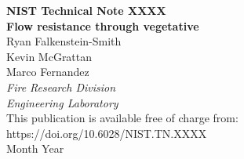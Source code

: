 \documentclass[12pt]{article}
\newcommand{\pubnumber}{XXXX}
\newcommand{\DOI}{https://doi.org/10.6028/NIST.TN.XXXX}
\newcommand{\monthyear}{Month Year}
\begin{document}
\begin{titlepage}
\begin{flushright}
\LARGE{\textbf{NIST Technical Note \pubnumber}}\\
\vfill 
\Huge{\textbf{Flow resistance through vegetative}}\\
\vfill
\normalsize Ryan Falkenstein-Smith\\
Kevin McGrattan\\
Marco Fernandez\\
\textit{Fire Research Division}\\
\textit{Engineering Laboratory}\\
\vspace{12pt}
\vfill
\normalsize This publication is available free of charge from:\\
\DOI\\
\vfill
\normalsize \monthyear
\vfill


\end{flushright}
\end{titlepage}
\end{document}

